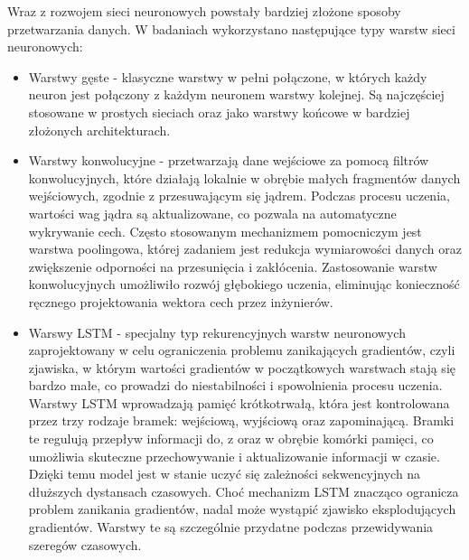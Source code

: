 \documentclass[a4paper,twoside,12pt]{book}
\begin{document}
Wraz z rozwojem sieci neuronowych powstały bardziej złożone sposoby przetwarzania danych. W badaniach wykorzystano następujące typy warstw sieci neuronowych:
\begin{itemize}
	\item Warstwy gęste - klasyczne warstwy w pełni połączone, w których każdy neuron jest połączony z każdym neuronem warstwy kolejnej. Są najczęściej stosowane w prostych sieciach oraz jako warstwy końcowe w bardziej złożonych architekturach.

	\item Warstwy konwolucyjne - przetwarzają dane wejściowe za pomocą filtrów konwolucyjnych, które działają lokalnie w obrębie małych fragmentów danych wejściowych, zgodnie z przesuwającym się jądrem. Podczas procesu uczenia, wartości wag jądra są aktualizowane, co pozwala na automatyczne wykrywanie cech. Często stosowanym mechanizmem pomocniczym jest warstwa poolingowa, której zadaniem jest redukcja wymiarowości danych oraz zwiększenie odporności na przesunięcia i zakłócenia.
	      Zastosowanie warstw konwolucyjnych umożliwiło rozwój głębokiego uczenia, eliminując konieczność ręcznego projektowania wektora cech przez inżynierów.

	\item Warswy LSTM - specjalny typ rekurencyjnych warstw neuronowych zaprojektowany w celu ograniczenia problemu zanikających gradientów, czyli zjawiska, w którym wartości gradientów w początkowych warstwach stają się bardzo małe, co prowadzi do niestabilności i spowolnienia procesu uczenia. Warstwy LSTM wprowadzają pamięć krótkotrwałą, która jest kontrolowana przez trzy rodzaje bramek: wejściową, wyjściową oraz zapominającą. Bramki te regulują przepływ informacji do, z oraz w obrębie komórki pamięci, co umożliwia skuteczne przechowywanie i aktualizowanie informacji w czasie. Dzięki temu model jest w stanie uczyć się zależności sekwencyjnych na dłuższych dystansach czasowych. Choć mechanizm LSTM znacząco ogranicza problem zanikania gradientów, nadal może wystąpić zjawisko eksplodujących gradientów. Warstwy te są szczególnie przydatne podczas przewidywania szeregów czasowych.
\end{itemize}
\end{document}
